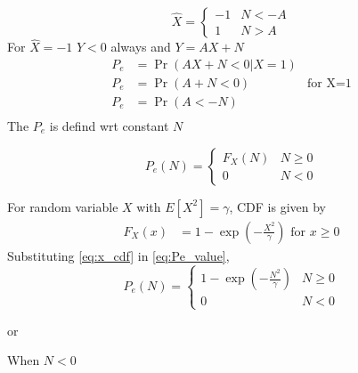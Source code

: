 \documentclass[journal,15pt,twocolumn]{IEEEtran}
\providecommand{\pr}[1]{\ensuremath{\Pr\left(#1\right)}}
\providecommand{\sbrak}[1]{\ensuremath{{}\left[#1\right]}}
\begin{document}
\begin{enumerate}
\begin{equation}
	 \hat X=
	\begin{cases} 
	-1 & N < -A\\
	1 & N > A
	\end{cases}
\end{equation}
For $\hat X=-1$ $Y<0$ always and $Y=AX+N$ 
\begin{align}
     P_e &=\pr{AX+N<0|X=1}\\
     P_e &=\pr{A+N<0}&\text{for X=1}\\ \nonumber 
     P_e &= \pr{A<-N}\\
\end{align}
The $P_e$ is defind wrt constant $N$ 

\begin{equation}
\label{eq:Pe_value}
P_e(N)=\begin{cases}
	F_X(N) & N \ge 0\\
	0 & N < 0
	\end{cases}
\end{equation}

For random variable $X$ with $E\sbrak{X^2} = \gamma$, CDF is given by
\begin{align}
	\label{eq:x_cdf}
	F_X(x) &= 1-\exp\left(-\frac{X^2}{\gamma}\right) \text{ for } x \ge 0
\end{align}
Substituting \eqref{eq:x_cdf} in \eqref{eq:Pe_value},
\begin{equation}
	P_e(N) =
	\begin{cases} 
	1-\exp\left(-\frac{N^2}{\gamma}\right) & N \ge 0\\
	0 & N < 0
	\end{cases}
\end{equation}
\begin{center}
    or
\end{center}
When $N < 0$


\end{enumerate}
\end{document}
